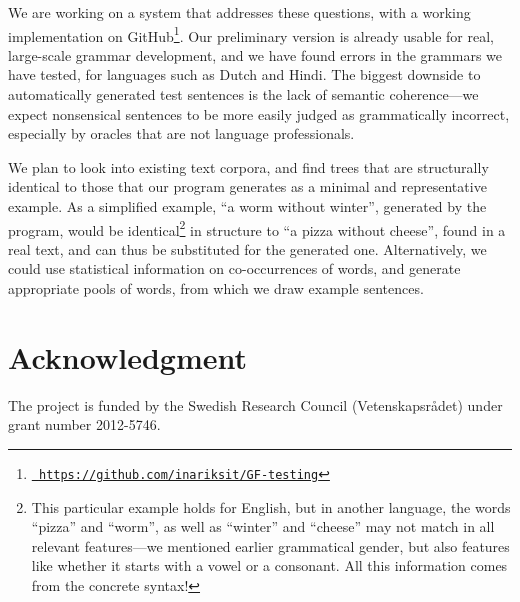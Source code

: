\documentclass[conference]{IEEEtran}
\begin{document}
We are working on a system that addresses these questions, with a working implementation on GitHub\footnote{\texttt{\small \url{ https://github.com/inariksit/GF-testing}}}. 
Our preliminary version is already usable for real, large-scale grammar development, and we have found errors in the grammars we have tested, for languages such as Dutch and Hindi.
The biggest downside to automatically generated test sentences is the lack of semantic coherence---we expect nonsensical sentences to be more easily judged as grammatically incorrect, especially by oracles that are not language professionals.

We plan to look into existing text corpora, and find trees that are structurally identical  to those that our program generates as a minimal and representative example. As a simplified example, ``a worm without winter'', generated by the program, would be identical\footnote{This particular example holds for English, but in another language, the words ``pizza'' and ``worm'', as well as ``winter'' and ``cheese'' may not match in all relevant features---we mentioned earlier grammatical gender, but also features like whether it starts with a vowel or a consonant. All this information comes from the concrete syntax!}
 in structure to ``a pizza without cheese'', found in a real text, and can thus be substituted for the generated one.  
Alternatively, we could use statistical information on co-occurrences of words, and generate appropriate pools of words, from which we draw example sentences.















\section*{Acknowledgment}

The project is funded by the Swedish Research Council (Vetenskapsr\r{a}det) under grant number 2012-5746.
\end{document}
